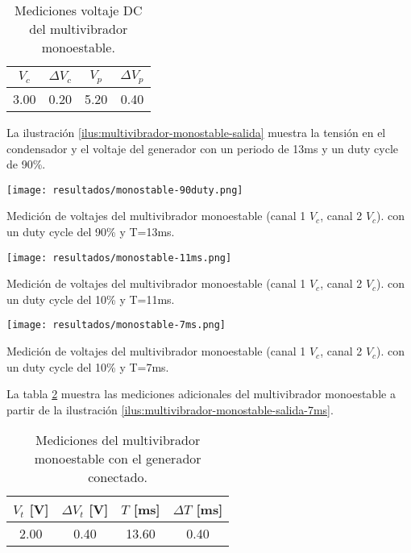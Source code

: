 \begin{table}[ht]
\centering
\begin{tabular}{|c|c|c|c|}
\hline
\(V_c\) & \(\Delta V_c\) & \(V_p\) & \(\Delta V_p\) \\ \hline
3.00 & 0.20 & 5.20 & 0.40 \\ \hline
\end{tabular}
\caption{Mediciones voltaje DC del multivibrador monoestable.}
\label{tab:resultados-multivibrador-monostable}
\end{table}

La ilustración \ref{ilus:multivibrador-monostable-salida} muestra la tensión en el condensador y el voltaje del generador con un periodo de 13ms y un duty cycle de 90\%.

\begin{ilustracion}
    \centering
    \texttt{[image: resultados/monostable-90duty.png]}
    \caption{Medición de voltajes del multivibrador monoestable (canal 1 $V_c$, canal 2 $V_c$). con un duty cycle del 90\% y T=13ms.}
    \label{ilus:multivibrador-monostable-salida}
\end{ilustracion}

\begin{ilustracion}
    \centering
    \texttt{[image: resultados/monostable-11ms.png]}
    \caption{Medición de voltajes del multivibrador monoestable (canal 1 $V_c$, canal 2 $V_c$). con un duty cycle del 10\% y T=11ms.}
    \label{ilus:multivibrador-monostable-salida-11ms}
\end{ilustracion}

\begin{ilustracion}
    \centering
    \texttt{[image: resultados/monostable-7ms.png]}
    \caption{Medición de voltajes del multivibrador monoestable (canal 1 $V_c$, canal 2 $V_c$). con un duty cycle del 10\% y T=7ms.}
    \label{ilus:multivibrador-monostable-salida-7ms}
\end{ilustracion}

La tabla \ref{tab:resultados-multivibrador-monostable-2} muestra las mediciones adicionales del multivibrador monoestable a partir de la ilustración \ref{ilus:multivibrador-monostable-salida-7ms}.

\begin{table}[ht]
\centering
\begin{tabular}{|c|c|c|c|}
\hline
\(V_t\) [V] & \(\Delta V_t\) [V] & \(T\) [ms] & \(\Delta T\) [ms]\\ \hline
2.00 & 0.40 & 13.60 & 0.40 \\ \hline
\end{tabular}
\caption{Mediciones del multivibrador monoestable con el generador conectado.}
\label{tab:resultados-multivibrador-monostable-2}
\end{table}
